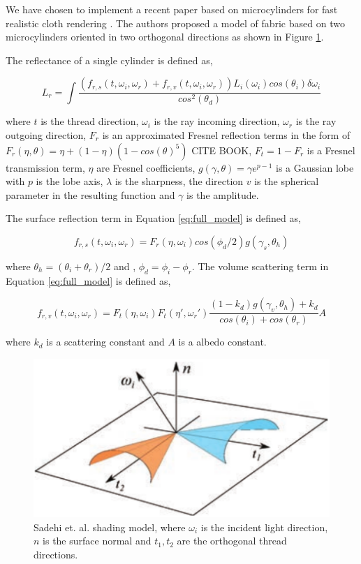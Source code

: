 \documentclass[12pt]{article}
\begin{document}
We have chosen to implement a recent paper based on microcylinders for fast realistic cloth rendering \cite{Sadeghi2013}.
The authors proposed a model of fabric based on two microcylinders oriented in two orthogonal directions as shown in Figure \ref{fig:microcylinders}.

The reflectance of a single cylinder is defined as,

\begin{equation}
L_r = \int \frac{\left(f_{r,s}(t, \omega_i, \omega_r) + f_{r,v}(t,\omega_i,\omega_r)\right)L_i(\omega_i)cos(\theta_i)\delta \omega_i}{cos^2(\theta_d)}
\label{eq:full_model}
\end{equation}

where $t$ is the thread direction, $\omega_i$ is the ray incoming direction, $\omega_r$ is the ray outgoing direction, $F_r$ is an approximated Fresnel reflection terms in  the form of $F_r(\eta, \theta) = \eta + (1 - \eta)(1 - cos(\theta)^5)$ CITE BOOK, $F_t = 1 - F_r$ is a Fresnel transmission term, $\eta$ are Fresnel coefficients, $g(\gamma, \theta) = \gamma e ^{p-1}$ is a Gaussian lobe with $p$ is the lobe axis, $\lambda$ is the sharpness, the direction $v$ is the spherical parameter in the resulting function and $\gamma$ is the amplitude.

The surface reflection term in Equation \ref{eq:full_model} is defined as,

\begin{equation}
f_{r,s}(t, \omega_i, \omega_r) = F_r(\eta, \omega_i) cos(\phi_d/2)g(\gamma_s, \theta_h)
\end{equation}

where $\theta_h = (\theta_i+\theta_r)/2$ and , $\phi_d = \phi_i-\phi_r$.
The volume scattering term in Equation \ref{eq:full_model} is defined as,

\begin{equation}
f_{r,v}(t,\omega_i,\omega_r) = F_t(\eta, \omega_i) F_t(\eta', \omega_r') \frac{(1-k_d)g(\gamma_v, \theta_h)+k_d}{cos(\theta_i) + cos(\theta_r)} A
\end{equation}

where $k_d$ is a scattering constant and $A$ is a albedo constant.

\begin{figure}[htbp!]
\centering
	\includegraphics[scale=0.35]{images/microcylinders}
	\caption{Sadehi et. al. \cite{Sadeghi2013} shading model, where $\omega_i$ is the incident light direction, $n$ is the surface normal and $t_1,t_2$ are the orthogonal thread directions.}
	\label{fig:microcylinders}
\end{figure}
\end{document}
